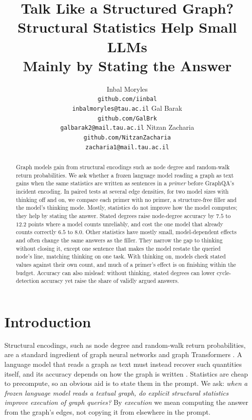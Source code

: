 \documentclass[11pt]{article}
\title{Talk Like a Structured Graph? Structural Statistics Help Small LLMs\\Mainly by Stating the Answer}
\author{
  Inbal Moryles\\
  \footnotesize\texttt{github.com/iinbal}\\
  \footnotesize\texttt{inbalmoryles@tau.ac.il}
  \And
  Gal Barak\\
  \footnotesize\texttt{github.com/GalBrk}\\
  \footnotesize\texttt{galbarak2@mail.tau.ac.il}
  \And
  Nitzan Zacharia\\
  \footnotesize\texttt{github.com/NitzanZacharia}\\
  \footnotesize\texttt{zacharia1@mail.tau.ac.il}
}
\date{}
\begin{document}
\raggedbottom
\maketitle
\begin{abstract}
Graph models gain from structural encodings such as node degree and random-walk return probabilities. We ask whether a frozen language model reading a graph as text gains when the same statistics are written as sentences in a \emph{primer} before GraphQA's incident encoding. In paired tests at several edge densities, for two model sizes with thinking off and on, we compare each primer with no primer, a structure-free filler and the model's thinking mode. Mostly, statistics do not improve how the model computes; they help by stating the answer. Stated degrees raise node-degree accuracy by $7.5$ to $12.2$ points where a model counts unreliably, and cost the one model that already counts correctly $6.5$ to $8.0$. Other statistics have mostly small, model-dependent effects and often change the same answers as the filler. They narrow the gap to thinking without closing it, except one sentence that makes the model restate the queried node's line, matching thinking on one task. With thinking on, models check stated values against their own count, and much of a primer's effect is on finishing within the budget. Accuracy can also mislead: without thinking, stated degrees can lower cycle-detection accuracy yet raise the share of validly argued answers. %
\end{abstract}

\section{Introduction}
\label{sec:intro}
Structural encodings, such as node degree and random-walk return probabilities, are a standard ingredient of graph neural networks and graph Transformers \citep{dwivedi2022graph,rampasek2022recipe}. A language model that reads a graph as text must instead recover such quantities itself, and its accuracy depends on how the graph is written \citep{fatemi2023talklikeagraph,wang2023nlgraph}. Statistics are cheap to precompute, so an obvious aid is to state them in the prompt. We ask: \emph{when a frozen language model reads a textual graph, do explicit structural statistics improve execution of graph queries?} By \emph{execution} we mean computing the answer from the graph's edges, not copying it from elsewhere in the prompt.
\end{document}
